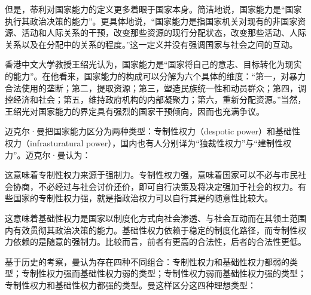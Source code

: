 但是，蒂利对国家能力的定义更多着眼于国家本身。简洁地说，国家能力是“国家执行其政治决策的能力”。更具体地说，“国家能力是指国家机关对现有的非国家资源、活动和人际关系的干预，改变那些资源的现行分配状态，改变那些活动、人际关系以及在分配中的关系的程度。”这一定义并没有强调国家与社会之间的互动。

香港中文大学教授王绍光认为，国家能力是“国家将自己的意志、目标转化为现实的能力”。在他看来，国家能力的构成可以分解为六个具体的维度：“第一，对暴力合法使用的垄断；第二，提取资源；第三，塑造民族统一性和动员群众；第四，调控经济和社会；第五，维持政府机构的内部凝聚力；第六，重新分配资源。”当然，王绍光对国家能力的界定具有强烈的国家干预倾向，因而也充满争议。


迈克尔·曼把国家能力区分为两种类型：专制性权力（despotic power）和基础性权力（infrasturatural power），国内也有人分别译为“独裁性权力”与“建制性权力”。迈克尔·曼认为：


这意味着专制性权力来源于强制力。专制性权力强，意味着国家可以不必与市民社会协商，不必经过与社会讨价还价，即可自行决策及将决定强加于社会的权力。有些国家的专制性权力强，就是指政治权力可以自行其是的随意性比较大。


这意味着基础性权力是国家以制度化方式向社会渗透、与社会互动而在其领土范围内有效贯彻其政治决策的能力。基础性权力依赖于稳定的制度化路径，而专制性权力依赖的是随意的强制力。比较而言，前者有更高的合法性，后者的合法性更低。

基于历史的考察，曼认为存在四种不同组合：专制性权力和基础性权力都弱的类型；专制性权力强而基础性权力弱的类型；专制性权力弱而基础性权力强的类型；专制性权力和基础性权力都强的类型。曼这样区分这四种理想类型：


